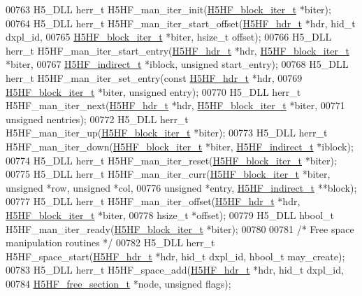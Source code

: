 \begin{DoxyCode}
00763 H5\_DLL herr\_t H5HF\_man\_iter\_init(\hyperlink{struct_h5_h_f__block__iter__t}{H5HF\_block\_iter\_t} *biter);
00764 H5\_DLL herr\_t H5HF\_man\_iter\_start\_offset(\hyperlink{struct_h5_h_f__hdr__t}{H5HF\_hdr\_t} *hdr, hid\_t dxpl\_id,
00765     \hyperlink{struct_h5_h_f__block__iter__t}{H5HF\_block\_iter\_t} *biter, hsize\_t offset);
00766 H5\_DLL herr\_t H5HF\_man\_iter\_start\_entry(\hyperlink{struct_h5_h_f__hdr__t}{H5HF\_hdr\_t} *hdr, 
      \hyperlink{struct_h5_h_f__block__iter__t}{H5HF\_block\_iter\_t} *biter,
00767     \hyperlink{struct_h5_h_f__indirect__t}{H5HF\_indirect\_t} *iblock, \textcolor{keywordtype}{unsigned} start\_entry);
00768 H5\_DLL herr\_t H5HF\_man\_iter\_set\_entry(\textcolor{keyword}{const} \hyperlink{struct_h5_h_f__hdr__t}{H5HF\_hdr\_t} *hdr,
00769     \hyperlink{struct_h5_h_f__block__iter__t}{H5HF\_block\_iter\_t} *biter, \textcolor{keywordtype}{unsigned} entry);
00770 H5\_DLL herr\_t H5HF\_man\_iter\_next(\hyperlink{struct_h5_h_f__hdr__t}{H5HF\_hdr\_t} *hdr, \hyperlink{struct_h5_h_f__block__iter__t}{H5HF\_block\_iter\_t} *biter,
00771     \textcolor{keywordtype}{unsigned} nentries);
00772 H5\_DLL herr\_t H5HF\_man\_iter\_up(\hyperlink{struct_h5_h_f__block__iter__t}{H5HF\_block\_iter\_t} *biter);
00773 H5\_DLL herr\_t H5HF\_man\_iter\_down(\hyperlink{struct_h5_h_f__block__iter__t}{H5HF\_block\_iter\_t} *biter, 
      \hyperlink{struct_h5_h_f__indirect__t}{H5HF\_indirect\_t} *iblock);
00774 H5\_DLL herr\_t H5HF\_man\_iter\_reset(\hyperlink{struct_h5_h_f__block__iter__t}{H5HF\_block\_iter\_t} *biter);
00775 H5\_DLL herr\_t H5HF\_man\_iter\_curr(\hyperlink{struct_h5_h_f__block__iter__t}{H5HF\_block\_iter\_t} *biter, \textcolor{keywordtype}{unsigned} *row, \textcolor{keywordtype}{unsigned} *col,
00776     \textcolor{keywordtype}{unsigned} *entry, \hyperlink{struct_h5_h_f__indirect__t}{H5HF\_indirect\_t} **block);
00777 H5\_DLL herr\_t H5HF\_man\_iter\_offset(\hyperlink{struct_h5_h_f__hdr__t}{H5HF\_hdr\_t} *hdr, \hyperlink{struct_h5_h_f__block__iter__t}{H5HF\_block\_iter\_t} *biter,
00778     hsize\_t *offset);
00779 H5\_DLL hbool\_t H5HF\_man\_iter\_ready(\hyperlink{struct_h5_h_f__block__iter__t}{H5HF\_block\_iter\_t} *biter);
00780 
00781 \textcolor{comment}{/* Free space manipulation routines */}
00782 H5\_DLL herr\_t H5HF\_space\_start(\hyperlink{struct_h5_h_f__hdr__t}{H5HF\_hdr\_t} *hdr, hid\_t dxpl\_id, hbool\_t may\_create);
00783 H5\_DLL herr\_t H5HF\_space\_add(\hyperlink{struct_h5_h_f__hdr__t}{H5HF\_hdr\_t} *hdr, hid\_t dxpl\_id,
00784     \hyperlink{struct_h5_h_f__free__section__t}{H5HF\_free\_section\_t} *node, \textcolor{keywordtype}{unsigned} flags);

\end{DoxyCode}
